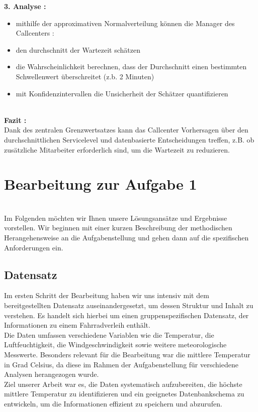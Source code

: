 \documentclass{article}
\begin{document}
\noindent\textbf{3. Analyse :}
\begin{itemize}
    \item mithilfe der approximativen Normalverteilung können die Manager des Callcenters :
    \item den durchschnitt der Wartezeit schätzen
    \item die Wahrscheinlichkeit berechnen, dass der Durchschnitt einen bestimmten Schwellenwert überschreitet (z.b. 2 Minuten)
    \item mit Konfidenzintervallen die Unsicherheit der Schätzer quantifizieren
\end{itemize}
\\

\noindent\textbf{Fazit :}
\\ Dank des zentralen Grenzwertsatzes kann das Callcenter Vorhersagen über den durchschnittlichen Servicelevel und datenbasierte Entscheidungen treffen, z.B. ob zusätzliche Mitarbeiter erforderlich sind, um die Wartezeit zu reduzieren.








\newpage
\section{Bearbeitung zur Aufgabe 1}
\\

Im Folgenden möchten wir Ihnen unsere Lösungsansätze und Ergebnisse vorstellen. Wir beginnen mit einer kurzen Beschreibung der methodischen Herangehensweise an die Aufgabenstellung und gehen dann auf die spezifischen Anforderungen ein.

\subsection{Datensatz}

Im ersten Schritt der Bearbeitung haben wir uns intensiv mit dem bereitgestellten Datensatz auseinandergesetzt, um dessen Struktur und Inhalt zu verstehen. Es handelt sich hierbei um einen gruppenspezifischen Datensatz, der Informationen zu einem Fahrradverleih enthält.
\\Die Daten umfassen verschiedene Variablen wie die Temperatur, die Luftfeuchtigkeit, die Windgeschwindigkeit sowie weitere meteorologische Messwerte. Besonders relevant für die Bearbeitung war die mittlere Temperatur in Grad Celsius, da diese im Rahmen der Aufgabenstellung für verschiedene Analysen herangezogen wurde.
\\Ziel unserer Arbeit war es, die Daten systematisch aufzubereiten, die höchste mittlere Temperatur zu identifizieren und ein geeignetes Datenbankschema zu entwickeln, um die Informationen effizient zu speichern und abzurufen.
\end{document}
